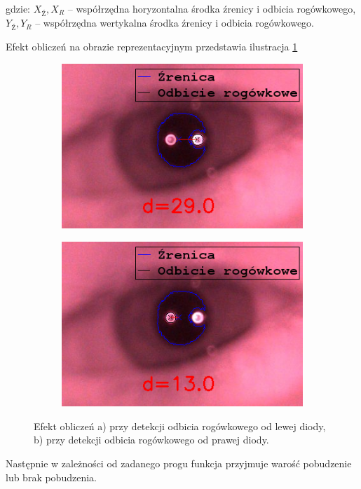 gdzie: $X_{\textit{Ź}}, X_{\textit{R}}$ -- współrzędna horyzontalna środka źrenicy i odbicia rogówkowego, $Y_{\textit{Ź}}, Y_{\textit{R}}$ -- współrzędna wertykalna środka źrenicy i odbicia rogówkowego.

Efekt obliczeń na obrazie reprezentacyjnym przedstawia ilustracja \ref{fig12}
\begin{figure}[h!]
  \begin{subfigure}[h!]{0.3\textwidth}\subcaption{\label{fig12a}}
    \centering
    \includegraphics[scale=0.5]{images/14.png}
  \end{subfigure}\hspace{2.5cm}
  \begin{subfigure}[h!]{0.3\textwidth}\subcaption{\label{fig12b}}
    \centering
    \includegraphics[scale=0.5]{images/15.png}
  \end{subfigure}
  \caption{Efekt obliczeń {a)} przy detekcji odbicia rogówkowego od lewej diody, {b)} przy detekcji odbicia rogówkowego od prawej diody. \label{fig12}}
\end{figure}

Następnie w zależności od zadanego progu funkcja przyjmuje warość pobudzenie lub brak pobudzenia.

